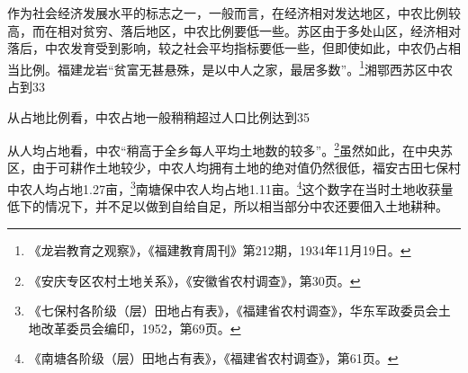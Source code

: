 作为社会经济发展水平的标志之一，一般而言，在经济相对发达地区，中农比例较高，而在相对贫穷、落后地区，中农比例要低一些。苏区由于多处山区，经济相对落后，中农发育受到影响，较之社会平均指标要低一些，但即使如此，中农仍占相当比例。福建龙岩“贫富无甚悬殊，是以中人之家，最居多数”。\footnote{《龙岩教育之观察》，《福建教育周刊》第212期，1934年11月19日。}湘鄂西苏区中农占到33%


从占地比例看，中农占地一般稍稍超过人口比例达到35%


从人均占地看，中农“稍高于全乡每人平均土地数的较多”。\footnote{《安庆专区农村土地关系》，《安徽省农村调查》，第30页。}虽然如此，在中央苏区，由于可耕作土地较少，中农人均拥有土地的绝对值仍然很低，福安古田七保村中农人均占地1.27亩，\footnote{《七保村各阶级（层）田地占有表》，《福建省农村调查》，华东军政委员会土地改革委员会编印，1952，第69页。}南塘保中农人均占地1.11亩。\footnote{《南塘各阶级（层）田地占有表》，《福建省农村调查》，第61页。}这个数字在当时土地收获量低下的情况下，并不足以做到自给自足，所以相当部分中农还要佃入土地耕种。


